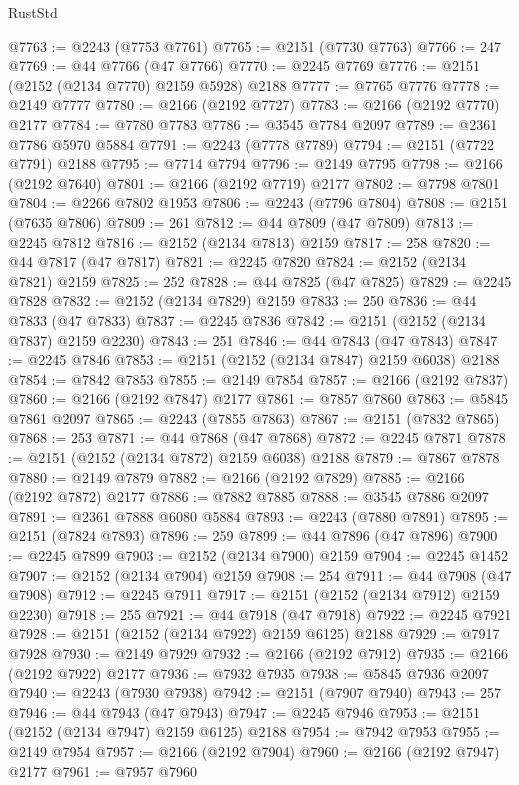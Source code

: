 \begin{lexlean}{RustStd}
\begin{coremodule}
@7763 := @2243 (@7753 @7761)
@7765 := @2151 (@7730 @7763)
@7766 := 247
@7769 := @44 @7766 (@47 @7766)
@7770 := @2245 @7769
@7776 := @2151 (@2152 (@2134 @7770) @2159 @5928) @2188
@7777 := @7765 @7776
@7778 := @2149 @7777
@7780 := @2166 (@2192 @7727)
@7783 := @2166 (@2192 @7770) @2177
@7784 := @7780 @7783
@7786 := @3545 @7784 @2097
@7789 := @2361 @7786 @5970 @5884
@7791 := @2243 (@7778 @7789)
@7794 := @2151 (@7722 @7791) @2188
@7795 := @7714 @7794
@7796 := @2149 @7795
@7798 := @2166 (@2192 @7640)
@7801 := @2166 (@2192 @7719) @2177
@7802 := @7798 @7801
@7804 := @2266 @7802 @1953
@7806 := @2243 (@7796 @7804)
@7808 := @2151 (@7635 @7806)
@7809 := 261
@7812 := @44 @7809 (@47 @7809)
@7813 := @2245 @7812
@7816 := @2152 (@2134 @7813) @2159
@7817 := 258
@7820 := @44 @7817 (@47 @7817)
@7821 := @2245 @7820
@7824 := @2152 (@2134 @7821) @2159
@7825 := 252
@7828 := @44 @7825 (@47 @7825)
@7829 := @2245 @7828
@7832 := @2152 (@2134 @7829) @2159
@7833 := 250
@7836 := @44 @7833 (@47 @7833)
@7837 := @2245 @7836
@7842 := @2151 (@2152 (@2134 @7837) @2159 @2230)
@7843 := 251
@7846 := @44 @7843 (@47 @7843)
@7847 := @2245 @7846
@7853 := @2151 (@2152 (@2134 @7847) @2159 @6038) @2188
@7854 := @7842 @7853
@7855 := @2149 @7854
@7857 := @2166 (@2192 @7837)
@7860 := @2166 (@2192 @7847) @2177
@7861 := @7857 @7860
@7863 := @5845 @7861 @2097
@7865 := @2243 (@7855 @7863)
@7867 := @2151 (@7832 @7865)
@7868 := 253
@7871 := @44 @7868 (@47 @7868)
@7872 := @2245 @7871
@7878 := @2151 (@2152 (@2134 @7872) @2159 @6038) @2188
@7879 := @7867 @7878
@7880 := @2149 @7879
@7882 := @2166 (@2192 @7829)
@7885 := @2166 (@2192 @7872) @2177
@7886 := @7882 @7885
@7888 := @3545 @7886 @2097
@7891 := @2361 @7888 @6080 @5884
@7893 := @2243 (@7880 @7891)
@7895 := @2151 (@7824 @7893)
@7896 := 259
@7899 := @44 @7896 (@47 @7896)
@7900 := @2245 @7899
@7903 := @2152 (@2134 @7900) @2159
@7904 := @2245 @1452
@7907 := @2152 (@2134 @7904) @2159
@7908 := 254
@7911 := @44 @7908 (@47 @7908)
@7912 := @2245 @7911
@7917 := @2151 (@2152 (@2134 @7912) @2159 @2230)
@7918 := 255
@7921 := @44 @7918 (@47 @7918)
@7922 := @2245 @7921
@7928 := @2151 (@2152 (@2134 @7922) @2159 @6125) @2188
@7929 := @7917 @7928
@7930 := @2149 @7929
@7932 := @2166 (@2192 @7912)
@7935 := @2166 (@2192 @7922) @2177
@7936 := @7932 @7935
@7938 := @5845 @7936 @2097
@7940 := @2243 (@7930 @7938)
@7942 := @2151 (@7907 @7940)
@7943 := 257
@7946 := @44 @7943 (@47 @7943)
@7947 := @2245 @7946
@7953 := @2151 (@2152 (@2134 @7947) @2159 @6125) @2188
@7954 := @7942 @7953
@7955 := @2149 @7954
@7957 := @2166 (@2192 @7904)
@7960 := @2166 (@2192 @7947) @2177
@7961 := @7957 @7960

\end{coremodule}
\end{lexlean}

